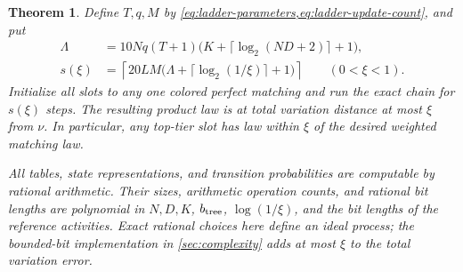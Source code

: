 \documentclass[11pt]{article}
\newtheorem{theorem}{Theorem}[section]
\theoremstyle{definition}
\theoremstyle{remark}
\numberwithin{equation}{section}
\begin{document}
\begin{theorem}\label{thm:bag-sampler}
Define $T,q,M$ by
\cref{eq:ladder-parameters,eq:ladder-update-count}, and put
\begin{align}
 \Lambda&=10Nq(T+1)
       \bigl(K+\lceil\log_2(ND+2)\rceil+1\bigr),
       \label{eq:ladder-lambda}\\
 s(\xi)&=\left\lceil20LM
       \bigl(\Lambda+\lceil\log_2(1/\xi)\rceil+1\bigr)\right\rceil
       \qquad(0<\xi<1).
       \label{eq:ladder-steps}
\end{align}
Initialize all slots to any one colored perfect matching and run the
exact chain for $s(\xi)$ steps. The resulting product law is at total
variation distance at most $\xi$ from $\nu$. In particular, any
top-tier slot has law within $\xi$ of the desired weighted matching
law.

All tables, state representations, and transition probabilities are
computable by rational arithmetic. Their sizes, arithmetic operation
counts, and rational bit lengths are polynomial in $N,D,K$,
$b_{\rm tree}$, $\log(1/\xi)$, and the bit lengths of the reference
activities. Exact rational choices here define an ideal process;
the bounded-bit implementation in \cref{sec:complexity} adds at most
$\xi$ to the total variation error.
\end{theorem}
\end{document}
